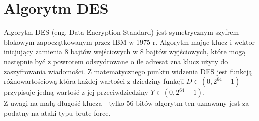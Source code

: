 \documentclass[oneside]{mgr}
\begin{document}
\section{Algorytm DES}
Algorytm DES (eng. Data Encryption Standard) jest symetrycznym szyfrem blokowym zapoczątkowanym przez IBM w 1975 r. Algorytm mając klucz i wektor inicjujący zamienia 8 bajtów wejściowych w 8 bajtów wyjściowych, które mogą następnie być z powrotem odszydrowane o ile adresat zna klucz użyty do zaszyfrowania wiadomości. Z matematycznego punktu widzenia DES jest funkcją różnowartościową która każdej wartości z dziedziny funkcji $D \in \left( 0, 2^{64}-1 \right)$ przypisuje jedną wartość z jej przeciwdziedziny $Y \in \left( 0, 2^{64}-1 \right)$.\\
Z uwagi na małą długość klucza - tylko 56 bitów algorytm ten uznawany jest za podatny na ataki typu brute force.
\end{document}
